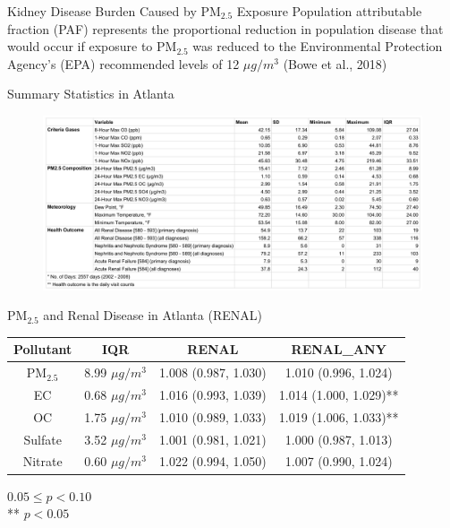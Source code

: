 \documentclass[handout]{beamer} %
\begin{document}
\begin{frame}{Kidney Disease Burden Caused by PM$_{2.5}$ Exposure}
    Population attributable fraction (PAF) represents the proportional reduction in population disease that would occur if exposure to PM$_{2.5}$ was reduced to the Environmental Protection Agency's (EPA) recommended levels of 12 $\mu g/m^3$ (Bowe et al., 2018)
\end{frame}

\begin{frame}{Summary Statistics in Atlanta}
    \begin{figure}[H]
        \centering
        \includegraphics[width=\textwidth]{img/appendix/Aim3/table.jpg}
    \end{figure}
\end{frame}

\begin{frame}{PM$_{2.5}$ and Renal Disease in Atlanta (RENAL)}
    \begin{table}
        \small
        \centering
        \begin{tabular}{c|c|c|c}
            \hline
            Pollutant & IQR & RENAL & RENAL\_ANY \\
            \hline
            PM$_{2.5}$ & 8.99 $\mu g/m^3$ & 1.008 (0.987, 1.030) & 1.010 (0.996, 1.024) \\
            EC & 0.68 $\mu g/m^3$ & 1.016 (0.993, 1.039) & 1.014 (1.000, 1.029)** \\
            OC & 1.75 $\mu g/m^3$ & 1.010 (0.989, 1.033) & 1.019 (1.006, 1.033)** \\
            Sulfate & 3.52 $\mu g/m^3$ & 1.001 (0.981, 1.021) & 1.000 (0.987, 1.013) \\
            Nitrate & 0.60 $\mu g/m^3$ & 1.022 (0.994, 1.050) & 1.007 (0.990, 1.024) \\
            \hline
        \end{tabular}
    \end{table}
    {\footnotesize * $0.05 \leq p < 0.10$ \\ ** $p < 0.05$}
\end{frame}
\end{document}
